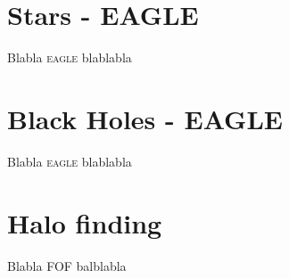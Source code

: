 \documentclass[a4paper,10pt]{report}
\newcommand{\eagle}{\textsc{eagle }}
\begin{document}
% 
% 
% 
% 
% 
% 
% 







\chapter{Stars - EAGLE}
\label{chap:stars}

Blabla \eagle blablabla








\chapter{Black Holes - EAGLE}
\label{chap:BHs}

Blabla \eagle blablabla





\chapter{Halo finding}
\label{chap:FOF}

Blabla FOF balblabla
\end{document}
